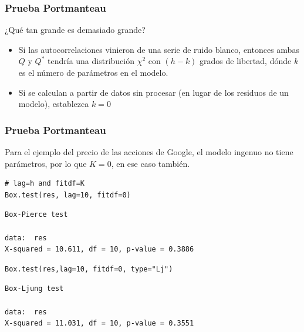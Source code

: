 \documentclass[10pt]{beamer}
\begin{document}


\begin{frame}
\frametitle{Prueba Portmanteau}


\vspace{3mm}

¿Qué tan grande es demasiado grande? 

\begin{itemize}
\item Si las autocorrelaciones vinieron de una serie de ruido blanco, entonces ambas $Q$ y $Q^*$ tendría una distribución $\chi^2$ con $(h - k)$ grados de libertad, dónde $k$ es el número de parámetros en el modelo.

\vspace{4mm}

\item Si se calculan a partir de datos sin procesar (en lugar de los residuos de un modelo), establezca $k=0$

\end{itemize}


\end{frame}






\begin{frame}[fragile]
\frametitle{Prueba Portmanteau}

Para el ejemplo del precio de las acciones de Google, el modelo ingenuo no tiene parámetros, por lo que $K= 0$, en ese caso también.

\vspace{4mm}


\begin{lstlisting}
# lag=h and fitdf=K
Box.test(res, lag=10, fitdf=0)
\end{lstlisting}

\pause

{\small
\begin{verbatim}
Box-Pierce test

data:  res
X-squared = 10.611, df = 10, p-value = 0.3886
\end{verbatim}
}

\pause


\begin{lstlisting}
Box.test(res,lag=10, fitdf=0, type="Lj")
\end{lstlisting}

\pause

{\small
\begin{verbatim}
Box-Ljung test

data:  res
X-squared = 11.031, df = 10, p-value = 0.3551
\end{verbatim}
}

\end{frame}
\end{document}
